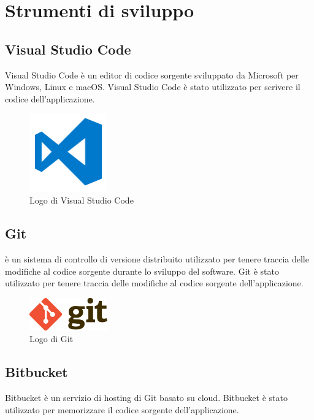 \section{Strumenti di sviluppo}
\subsection{Visual Studio Code}
Visual Studio Code è un editor di codice sorgente sviluppato da Microsoft per Windows, Linux e macOS. Visual Studio Code è stato utilizzato per scrivere il codice dell'applicazione.

\begin{figure}[h]
  \centering
  \includegraphics[width=0.3\textwidth]{img/tecnologie/vscode.png}
  \caption{Logo di Visual Studio Code}
  \label{fig:vscode}
\end{figure}

\subsection{Git}
 è un sistema di controllo di versione distribuito utilizzato per tenere traccia delle modifiche al codice sorgente durante lo sviluppo del software. Git è stato utilizzato per tenere traccia delle modifiche al codice sorgente dell'applicazione.

\begin{figure}[h]
  \centering
  \includegraphics[width=0.3\textwidth]{img/tecnologie/git.png}
  \caption{Logo di Git}
  \label{fig:git}
\end{figure}

\subsection{Bitbucket}
Bitbucket è un servizio di hosting di  Git basato su cloud. Bitbucket è stato utilizzato per memorizzare il codice sorgente dell'applicazione.

